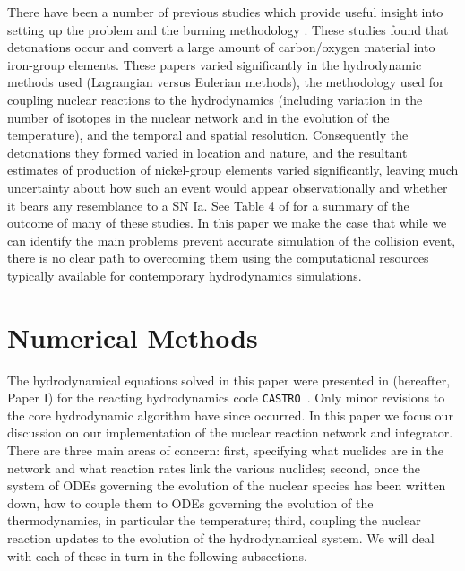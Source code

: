 \documentclass[twocolumn,numberedappendix]{../aastex6}
\newcommand{\castro}{\texttt{CASTRO}}
\begin{document}
There have been a number of previous studies which provide useful insight into setting up
the problem and the burning methodology \citep{rosswog:2009,raskin:2010,loren-aguilar:2010,
hawley:2012,garcia-senz:2013,kushnir:2013,papish:2015,holcomb:2015}. These studies
found that detonations occur and convert a large amount of carbon/oxygen material into
iron-group elements. These papers varied significantly in the hydrodynamic methods used
(Lagrangian versus Eulerian methods), the methodology used for coupling nuclear
reactions to the hydrodynamics (including variation in the number of isotopes in
the nuclear network and in the evolution of the temperature), and the temporal and
spatial resolution. Consequently the detonations they formed varied in location and nature,
and the resultant estimates of production of nickel-group elements varied significantly,
leaving much uncertainty about how such an event would appear observationally and whether
it bears any resemblance to a SN Ia. See Table 4 of \cite{garcia-senz:2013} for a summary
of the outcome of many of these studies. In this paper we make the case that
while we can identify the main problems prevent accurate simulation of the collision
event, there is no clear path to overcoming them using the computational resources
typically available for contemporary hydrodynamics simulations.

\section{Numerical Methods}
\label{sec:numericalmethods}

The hydrodynamical equations solved in this paper were presented in \citet{wdmergerI}
(hereafter, Paper I) for the reacting hydrodynamics code \castro\ \citep{castro}.
Only minor revisions to the core hydrodynamic algorithm have since occurred.
In this paper we focus our discussion on our implementation of the nuclear
reaction network and integrator. There are three main areas of concern: first,
specifying what nuclides are in the network and what reaction rates link the
various nuclides; second, once the system of ODEs governing the evolution of
the nuclear species has been written down, how to couple them to ODEs governing
the evolution of the thermodynamics, in particular the temperature; third,
coupling the nuclear reaction updates to the evolution of the hydrodynamical
system. We will deal with each of these in turn in the following subsections.
\end{document}

